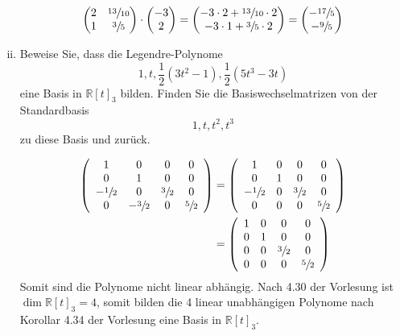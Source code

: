 \documentclass{article}
\begin{document}
\begin{enumerate}[(i)]
  \[
    \begin{pmatrix}2&\sfrac{13}{10}\\1&\sfrac{3}{5}\end{pmatrix} \cdot \begin{pmatrix}-3\\2\end{pmatrix}
    =
    \begin{pmatrix}
      -3 \cdot 2 + \sfrac{13}{10} \cdot 2 \\
      -3 \cdot 1 + \sfrac{3}{5} \cdot 2 \\
    \end{pmatrix}
    =
    \begin{pmatrix}
      -\sfrac{17}{5} \\
      -\sfrac{9}{5}  \\
    \end{pmatrix}
  \]
\item
  Beweise Sie, dass die Legendre-Polynome
  \[
    1, t, \frac{1}{2}(3t^2 - 1), \frac{1}{2}(5t^3 - 3t)
  \]
  eine Basis in $\mathbb{R}[t]_3$ bilden. Finden Sie die Basiswechselmatrizen von der Standardbasis
  \[
    1,t,t^2,t^3
  \]
  zu diese Basis und zurück.

  \begin{align*}
    \left(
      \begin{array}{cccc}
        1             & 0             & 0            & 0            \\
        0             & 1             & 0            & 0            \\
        -\sfrac{1}{2} & 0             & \sfrac{3}{2} & 0            \\
        0             & -\sfrac{3}{2} & 0            & \sfrac{5}{2} \\
      \end{array}
    \right)
    &=
    \left(
      \begin{array}{cccc}
        1             & 0 & 0            & 0            \\
        0             & 1 & 0            & 0            \\
        -\sfrac{1}{2} & 0 & \sfrac{3}{2} & 0            \\
        0             & 0 & 0            & \sfrac{5}{2} \\
      \end{array}
    \right) \\
    &=
    \left(
      \begin{array}{cccc}
        1 & 0 & 0            & 0            \\
        0 & 1 & 0            & 0            \\
        0 & 0 & \sfrac{3}{2} & 0            \\
        0 & 0 & 0            & \sfrac{5}{2} \\
      \end{array}
    \right) \\
  \end{align*}
  Somit sind die Polynome nicht linear abhängig. Nach 4.30 der Vorlesung ist $\dim \mathbb{R}[t]_3 = 4$, somit
  bilden die 4 linear unabhängigen Polynome nach Korollar 4.34 der Vorlesung eine Basis in $\mathbb{R}[t]_3$.


\end{enumerate}
\end{document}
